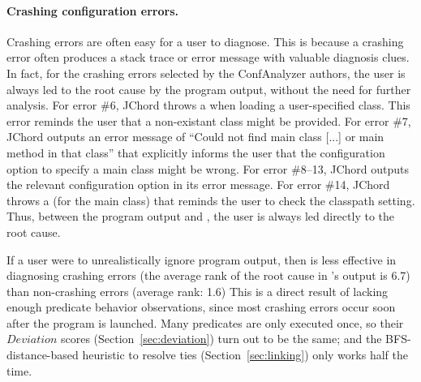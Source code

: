 
\paragraph{Crashing configuration errors.}

Crashing errors are often easy for a user to diagnose.
This is because a crashing error often produces a stack trace or error message with valuable diagnosis clues.
In fact, for the crashing errors selected by the ConfAnalyzer authors, the
user is always led to the root cause by the program output,
without the need for further analysis.
For error \#6, JChord throws a 
when loading a user-specified class. This error
reminds the user that a non-existant class might be provided.
For error \#7, JChord outputs an error message of ``Could not find main class [...]
or main method in that class'' that explicitly informs the user that
the configuration option to specify a main class might be wrong.
For error \#8--13,
JChord outputs the relevant configuration option in its error message.
For error \#14, JChord throws a 
(for the main class) that reminds the user to check the classpath setting.  
Thus, between the program output and \ourtool, the user is
always led directly to the
root cause.




If a user were to unrealistically ignore program output, then \ourtool is less effective
in diagnosing crashing errors (the average rank of the root cause
in \ourtool's output is 6.7) than non-crashing errors (average rank: 1.6)
This is a direct result of lacking enough predicate behavior observations,
since most crashing errors occur soon
after the program is launched.  Many predicates are
only executed once, so their $Deviation$ scores
 (Section~\ref{sec:deviation}) turn out to be the same; and the
 BFS-distance-based heuristic to resolve ties (Section~\ref{sec:linking}) only
works half the time.


